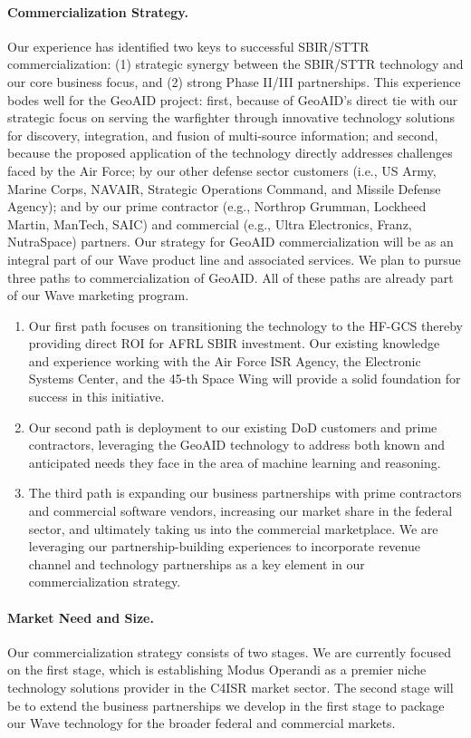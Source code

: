 \documentclass{sbir}
\begin{document}
\paragraph{Commercialization Strategy.} Our experience has identified two keys to successful SBIR/STTR commercialization: (1) strategic synergy between the SBIR/STTR technology and our core business focus, and (2) strong Phase II/III partnerships.
This experience bodes well for the GeoAID project: first, because of GeoAID's direct tie with our strategic focus on serving the warfighter through innovative technology solutions for discovery, integration, and fusion of multi-source information; and second, because the proposed application of the technology directly addresses challenges faced by the Air Force; by our other defense sector customers (i.e., US Army, Marine Corps, NAVAIR, Strategic Operations Command, and Missile Defense Agency); and by our prime contractor (e.g., Northrop Grumman, Lockheed Martin, ManTech, SAIC) and commercial (e.g., Ultra Electronics, Franz, NutraSpace) partners.
Our strategy for GeoAID commercialization will be as an integral part of our Wave product line and associated services. We plan to pursue three paths to commercialization of GeoAID. All of these paths are already part of our Wave marketing program.
\begin{enumerate}
  \item Our first path focuses on transitioning the technology to the HF-GCS thereby providing direct ROI for AFRL SBIR investment. Our existing knowledge and experience working with the Air Force ISR Agency, the Electronic Systems Center, and the 45-th Space Wing will provide a solid foundation for success in this initiative.
  \item Our second path is deployment to our existing DoD customers and prime contractors, leveraging the GeoAID technology to address both known and anticipated needs they face in the area of machine learning and reasoning.
  \item The third path is expanding our business partnerships with prime contractors and commercial software vendors, increasing our market share in the federal sector, and ultimately taking us into the commercial marketplace. We are leveraging our partnership-building experiences to incorporate revenue channel and technology partnerships as a key element in our commercialization strategy.
\end{enumerate}

\paragraph{Market Need and Size.} Our commercialization strategy consists of two stages. We are currently focused on the first stage, which is establishing Modus Operandi as a premier niche technology solutions provider in the C4ISR market sector. The second stage will be to extend the business partnerships we develop in the first stage to package our Wave technology for the broader federal and commercial markets.
\end{document}
